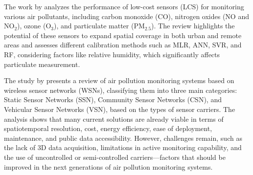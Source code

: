 \documentclass[conference]{IEEEtran}
\begin{document}
The work by \cite{karagulian_2019_review} analyzes the performance of low-cost sensors (LCS) for monitoring various air pollutants, including carbon monoxide (CO), nitrogen oxides (NO and NO$_2$), ozone (O$_3$), and particulate matter (PM$_{2.5}$). The review highlights the potential of these sensors to expand spatial coverage in both urban and remote areas and assesses different calibration methods such as MLR, ANN, SVR, and RF, considering factors like relative humidity, which significantly affects particulate measurement.

The study by \cite{yi_2015_a} presents a review of air pollution monitoring systems based on wireless sensor networks (WSNs), classifying them into three main categories: Static Sensor Networks (SSN), Community Sensor Networks (CSN), and Vehicular Sensor Networks (VSN), based on the types of sensor carriers. The analysis shows that many current solutions are already viable in terms of spatiotemporal resolution, cost, energy efficiency, ease of deployment, maintenance, and public data accessibility. However, challenges remain, such as the lack of 3D data acquisition, limitations in active monitoring capability, and the use of uncontrolled or semi-controlled carriers—factors that should be improved in the next generations of air pollution monitoring systems.



\end{document}
